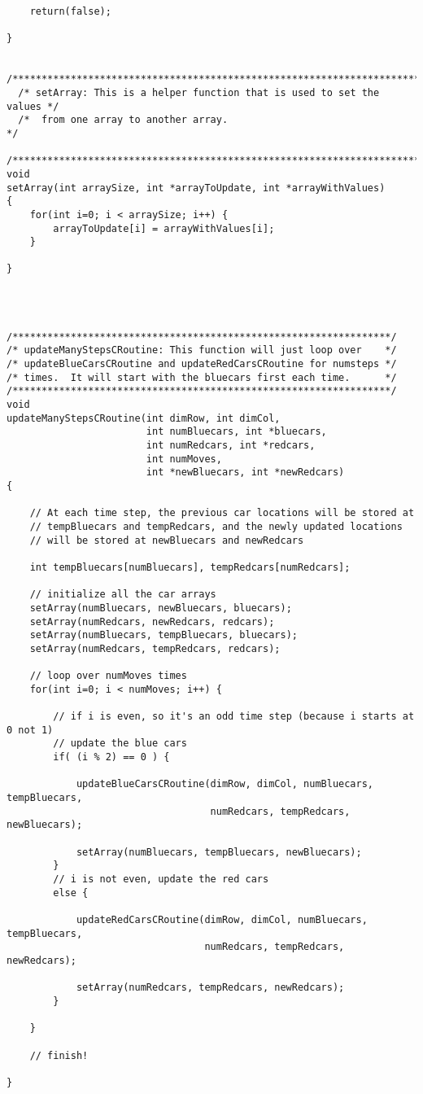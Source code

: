 \documentclass[11pt]{article}
\begin{document}
\begin{verbatim}
    return(false);

}

  /**********************************************************************/
  /* setArray: This is a helper function that is used to set the values */
  /*  from one array to another array.                                  */
  /**********************************************************************/
void 
setArray(int arraySize, int *arrayToUpdate, int *arrayWithValues) 
{ 
    for(int i=0; i < arraySize; i++) {
        arrayToUpdate[i] = arrayWithValues[i];
    }

}




/*****************************************************************/
/* updateManyStepsCRoutine: This function will just loop over    */
/* updateBlueCarsCRoutine and updateRedCarsCRoutine for numsteps */
/* times.  It will start with the bluecars first each time.      */
/*****************************************************************/
void
updateManyStepsCRoutine(int dimRow, int dimCol,
                        int numBluecars, int *bluecars,
                        int numRedcars, int *redcars,
                        int numMoves,
                        int *newBluecars, int *newRedcars)
{

    // At each time step, the previous car locations will be stored at
    // tempBluecars and tempRedcars, and the newly updated locations
    // will be stored at newBluecars and newRedcars

    int tempBluecars[numBluecars], tempRedcars[numRedcars];

    // initialize all the car arrays
    setArray(numBluecars, newBluecars, bluecars);
    setArray(numRedcars, newRedcars, redcars);
    setArray(numBluecars, tempBluecars, bluecars);
    setArray(numRedcars, tempRedcars, redcars);

    // loop over numMoves times
    for(int i=0; i < numMoves; i++) {

        // if i is even, so it's an odd time step (because i starts at 0 not 1)
        // update the blue cars
        if( (i % 2) == 0 ) {

            updateBlueCarsCRoutine(dimRow, dimCol, numBluecars, tempBluecars,
                                   numRedcars, tempRedcars, newBluecars);

            setArray(numBluecars, tempBluecars, newBluecars);
        }
        // i is not even, update the red cars
        else {

            updateRedCarsCRoutine(dimRow, dimCol, numBluecars, tempBluecars,
                                  numRedcars, tempRedcars, newRedcars);

            setArray(numRedcars, tempRedcars, newRedcars);
        }

    } 

    // finish!

}
\end{verbatim}
\end{document}

